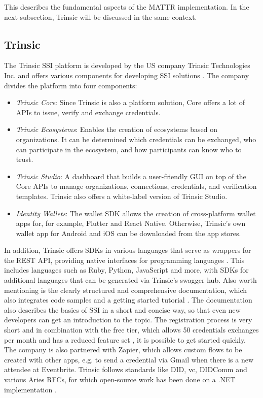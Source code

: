     This describes the fundamental aspects of the MATTR implementation. In the next subsection, Trinsic will be discussed in the same context.
    \vfill
    
    \subsection{Trinsic}\label{subsection: trinsic}
    The Trinsic SSI platform is developed by the US company Trinsic Technologies Inc. and offers various components for developing SSI solutions \cite{trinsic_trinsic_2021}. The company divides the platform into four components:
    
    \begin{itemize}
        \item \textit{Trinsic Core}: Since Trinsic is also a platform solution, Core offers a lot of APIs to issue, verify and exchange credentials. \cite{trinsic_trinsic_2021-1}
        \item \textit{Trinsic Ecosystems}: Enables the creation of ecosystems based on organizations. It can be determined which credentials can be exchanged, who can participate in the ecosystem, and how participants can know who to trust. \cite{trinsic_trinsic_2021-2}
        \item \textit{Trinsic Studio}: A dashboard that builds a user-friendly GUI on top of the Core APIs to manage organizations, connections, credentials, and verification templates. Trinsic also offers a white-label version of Trinsic Studio. \cite{trinsic_trinsic_2021-3}
        \item \textit{Identity Wallets}: The wallet SDK allows the creation of cross-platform wallet apps for, for example, Flutter and React Native. Otherwise, Trinsic's own wallet app for Android and iOS can be downloaded from the app stores. \cite{trinsic_identity_2021}
    \end{itemize}
    
    In addition, Trinsic offers SDKs in various languages that serve as wrappers for the REST API, providing native interfaces for programming languages \cite{trinsic_service_2021}. This includes languages such as Ruby, Python, JavaScript and more, with SDKs for additional languages that can be generated via Trinsic's swagger hub. Also worth mentioning is the clearly structured and comprehensive documentation, which also integrates code samples and a getting started tutorial \cite{trinsic_introduction_2021}. The documentation also describes the basics of SSI in a short and concise way, so that even new developers can get an introduction to the topic. The registration process is very short and in combination with the free tier, which allows 50 credentials exchanges per month and has a reduced feature set \cite{trinsic_pricing_2021}, it is possible to get started quickly. The company is also partnered with Zapier, which allows custom flows to be created with other apps, e.g. to send a credential via Gmail when there is a new attendee at Eventbrite. Trinsic follows standards like \ac{DID}, \ac{vc}, DIDComm and various Aries RFCs, for which open-source work has been done on a .NET implementation \cite{trinsic_open_2021}.
    

